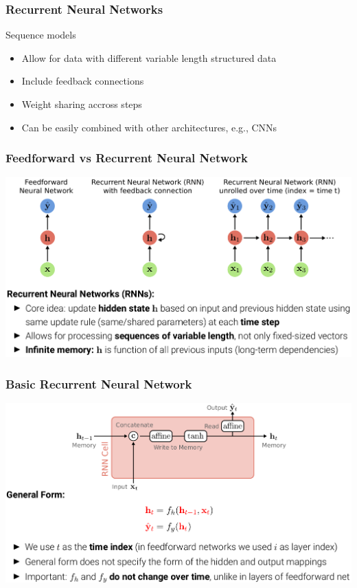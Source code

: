\documentclass[10pt]{beamer}
\begin{document}
\begin{frame}
  \frametitle{Recurrent Neural Networks}
Sequence models
\vspace{.5cm}
\begin{itemize}
	\vspace{.1cm}	\item Allow for data with different variable length structured data 
	\vspace{.1cm}	\item Include feedback connections
	\vspace{.1cm}	\item Weight sharing accross steps
	\vspace{.1cm}	\item Can be easily combined with other architectures, e.g., CNNs
\end{itemize}
\end{frame}



\begin{frame}
  \frametitle{Feedforward vs Recurrent Neural Network}
\begin{center}
\includegraphics[width=\textwidth]{images/s2}
\end{center}
\end{frame}


\begin{frame}
  \frametitle{Basic Recurrent Neural Network}
\begin{center}
\includegraphics[width=\textwidth]{images/s3}
\end{center}
\end{frame}
\end{document}
